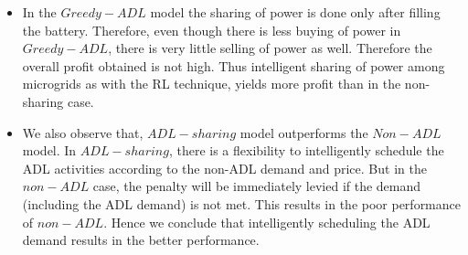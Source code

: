 \begin{itemize}

\item In the $Greedy-ADL$ model the sharing of power is done only after filling the battery. Therefore, even though there is less buying of power in $Greedy-ADL$, there is very little selling of power as well. Therefore the overall profit obtained is not high. Thus intelligent sharing of power among microgrids as with the RL technique, yields more profit than in the non-sharing case. 

\item We also observe that, $ADL-sharing$ model outperforms the $Non-ADL$ model. In $ADL-sharing$, there is a flexibility to intelligently schedule the ADL activities according to the non-ADL demand and price. But in the $non-ADL$ case, the penalty will be immediately levied if the demand (including the ADL demand) is not met. This results in the poor performance of $non-ADL$. Hence we conclude that intelligently scheduling the ADL demand results in the better performance.





\end{itemize}
